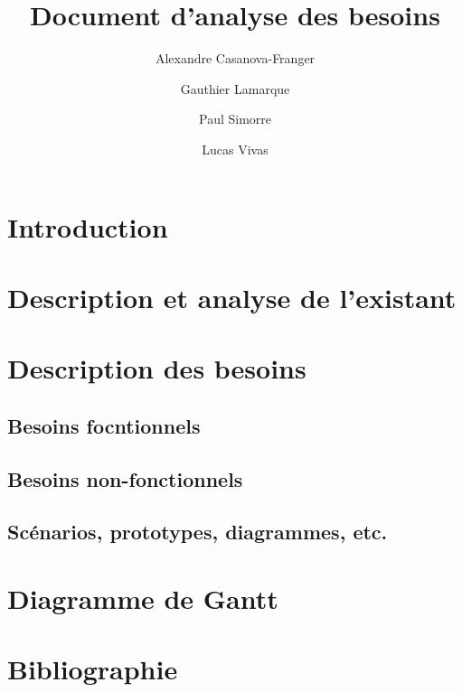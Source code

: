 \documentclass{article}
\title{Document d'analyse des besoins}
\author{Alexandre Casanova-Franger\\
        \and
        Gauthier Lamarque\\
        \and
        Paul Simorre\\
        \and
        Lucas Vivas\\}
\begin{document}
  \maketitle
  \section{Introduction}
  \section{Description et analyse de l'existant}
  \section{Description des besoins}
    \subsection{Besoins focntionnels}
    \subsection{Besoins non-fonctionnels}
    \subsection{Scénarios, prototypes, diagrammes, etc.}
  \section{Diagramme de Gantt}
  \section{Bibliographie}
\end{document}

